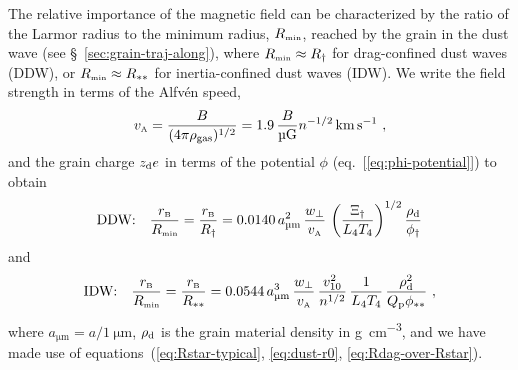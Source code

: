 The relative importance of the magnetic field can be characterized by
the ratio of the Larmor radius to the minimum radius, \(R_{\scriptscriptstyle\text{min}}\),
reached by the grain in the dust wave (see
\S~\ref{sec:grain-traj-along}), where \(R_{\scriptscriptstyle\text{min}} \approx R_\dag\) for
drag-confined dust waves (DDW), or \(R_{\scriptscriptstyle\text{min}} \approx R_{**}\) for
inertia-confined dust waves (IDW).  We write the field strength in
terms of the Alfvén speed,
\begin{equation}
  \label{eq:alfven}
  v\alfven = \frac{B}{(4\pi\rho\gas)^{1/2}}
  = 1.9\, \frac{B}{\si{\micro G}} n^{-1/2} \, \si{km.s^{-1}} \ ,
\end{equation}
and the grain charge \(z_{\text{d}} e\) in terms of the potential \(\phi\) (eq.~[\ref{eq:phi-potential}]) to obtain
\begin{equation}
  \label{eq:larmor-over-Rdag}
  \text{DDW:}\quad \frac{r\B}{\Rmin} =  
  \frac{r\B}{R_\dag} = 0.0140 \,
  a_{\si{\um}}^2 \,
  \frac{w_\perp}{v\alfven} \,
  \left( \frac{\Xi_\dag}{L_4 T_4} \right)^{1/2}
  \frac{\rho\grain}{\phi_\dag}
\end{equation}
and
\begin{equation}
  \label{eq:larmor-over-Rstarstar}
  \text{IDW:}\quad \frac{r\B}{\Rmin} =  
  \frac{r\B}{R\starstar} = 0.0544 \,
  a_{\si{\um}}^3 \,
  \frac{w_\perp}{v\alfven} \,
  \frac{v_{10}^2 }{n^{1/2}} \,
  \frac{1}{L_4 T_4} \,
  \frac{\rho\grain^2}{\Qp \phi\starstar} \ ,
\end{equation}
where \(a_{\si{\um}} = a / \SI{1}{\um}\), \(\rho_{\text{d}}\) is the grain
material density in \si{g.cm^{-3}}, and we have made use of
equations~(\ref{eq:Rstar-typical}, \ref{eq:dust-r0}, \ref{eq:Rdag-over-Rstar}).

